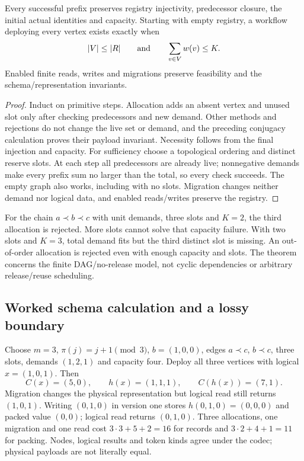 \begin{theorem}\label{thm:B-capacity}
Every successful prefix preserves registry injectivity, predecessor closure,
the initial actual identities and capacity. Starting with empty registry,
a workflow deploying every vertex exists exactly when
\[
|V|\leq|R|\qquad\hbox{and}\qquad\sum_{v\in V}w(v)\leq K.
\]
Enabled finite reads, writes and migrations preserve feasibility and the
schema/representation invariants.
\end{theorem}
\begin{proof}
Induct on primitive steps. Allocation adds an absent vertex and unused
slot only after checking predecessors and new demand. Other methods and
rejections do not change the live set or demand, and the preceding
conjugacy calculation proves their payload invariant. Necessity follows
from the final injection and capacity. For sufficiency choose a
topological ordering and distinct reserve slots. At each step all
predecessors are already live; nonnegative demands make every prefix
sum no larger than the total, so every check succeeds. The empty graph
also works, including with no slots. Migration changes neither demand
nor logical data, and enabled reads/writes preserve the registry.
\end{proof}
For the chain $a\prec b\prec c$ with unit demands, three slots and
$K=2$, the third allocation is rejected. More slots cannot solve that
capacity failure. With two slots and $K=3$, total demand fits but the
third distinct slot is missing. An out-of-order allocation is rejected
even with enough capacity and slots. The theorem concerns the finite
DAG/no-release model, not cyclic dependencies or arbitrary release/reuse
scheduling.

\subsection{Worked schema calculation and a lossy boundary}
Choose $m=3$, $\pi(j)=j+1\pmod3$, $b=(1,0,0)$, edges
$a\prec c$, $b\prec c$, three slots, demands $(1,2,1)$ and capacity
four. Deploy all three vertices with logical $x=(1,0,1)$.
Then
\[
C(x)=(5,0),\qquad h(x)=(1,1,1),\qquad C(h(x))=(7,1).
\]
Migration changes the physical representation but logical read still
returns $(1,0,1)$. Writing $(0,1,0)$ in version one stores
$h(0,1,0)=(0,0,0)$ and packed value $(0,0)$; logical read returns
$(0,1,0)$. Three allocations, one migration and one read cost
$3\cdot3+5+2=16$ for records and $3\cdot2+4+1=11$ for packing.
Nodes, logical results and token kinds agree under the codec; physical
payloads are not literally equal.

